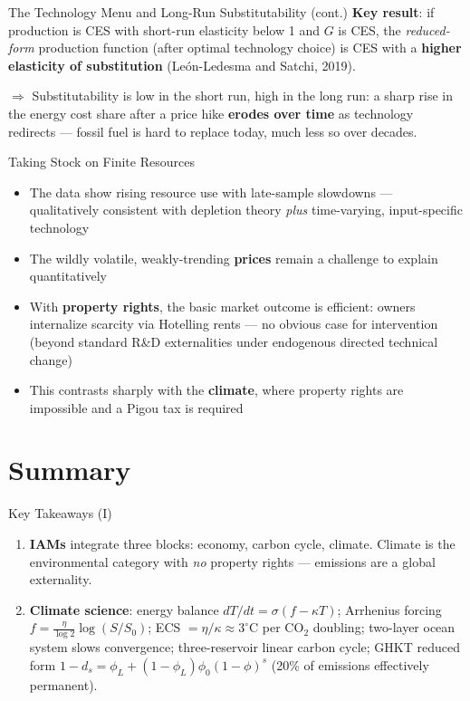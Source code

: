 \documentclass[blue]{beamer}
\begin{document}
\begin{frame}{The Technology Menu and Long-Run Substitutability (cont.)}
\bigskip
\textbf{Key result}: if production is CES with short-run elasticity below 1 and $G$ is CES, the \emph{reduced-form} production function (after optimal technology choice) is CES with a \textbf{higher elasticity of substitution} (Le\'on-Ledesma and Satchi, 2019).

\bigskip
$\Rightarrow$ Substitutability is low in the short run, high in the long run: a sharp rise in the energy cost share after a price hike \textbf{erodes over time} as technology redirects --- fossil fuel is hard to replace today, much less so over decades.
\end{frame}

\begin{frame}{Taking Stock on Finite Resources}
\begin{itemize}
    \item The data show rising resource use with late-sample slowdowns --- qualitatively consistent with depletion theory \emph{plus} time-varying, input-specific technology

    \item The wildly volatile, weakly-trending \textbf{prices} remain a challenge to explain quantitatively

    \item With \textbf{property rights}, the basic market outcome is efficient: owners internalize scarcity via Hotelling rents --- no obvious case for intervention (beyond standard R\&D externalities under endogenous directed technical change)

    \item This contrasts sharply with the \textbf{climate}, where property rights are impossible and a Pigou tax is required
\end{itemize}
\end{frame}

\section{Summary}

\begin{frame}{Key Takeaways (I)}
\small
\begin{enumerate}
    \item \textbf{IAMs} integrate three blocks: economy, carbon cycle, climate. Climate is the environmental category with \emph{no} property rights --- emissions are a global externality.

    \item \textbf{Climate science}: energy balance $dT/dt = \sigma(f - \kappa T)$; Arrhenius forcing $f = \frac{\eta}{\log 2}\log(S/S_0)$; ECS $= \eta/\kappa \approx 3^{\circ}$C per CO$_2$ doubling; two-layer ocean system slows convergence; three-reservoir linear carbon cycle; GHKT reduced form $1 - d_s = \phi_L + (1-\phi_L)\phi_0(1-\phi)^s$ (20\% of emissions effectively permanent).

\end{enumerate}
\end{frame}
\end{document}
